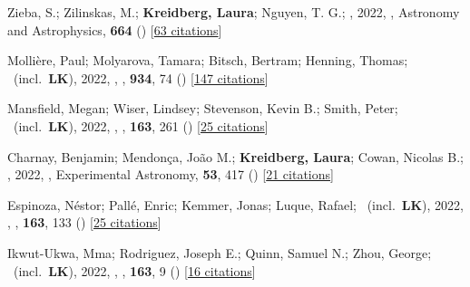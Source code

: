 \item[{\color{numcolor}\scriptsize67}] Zieba, S.; Zilinskas, M.; \textbf{Kreidberg, Laura}; Nguyen, T. G.; \etal, 2022, , Astronomy and Astrophysics, \textbf{664} () [\href{https://ui.adsabs.harvard.edu/abs/2022A&A...664A..79Z}{63 citations}]

\item[{\color{numcolor}\scriptsize66}] Molli{\`e}re, Paul; Molyarova, Tamara; Bitsch, Bertram; Henning, Thomas; \etal\ (incl.\ \textbf{LK}), 2022, , \apj, \textbf{934}, 74 () [\href{https://ui.adsabs.harvard.edu/abs/2022ApJ...934...74M}{147 citations}]

\item[{\color{numcolor}\scriptsize65}] Mansfield, Megan; Wiser, Lindsey; Stevenson, Kevin B.; Smith, Peter; \etal\ (incl.\ \textbf{LK}), 2022, , \aj, \textbf{163}, 261 () [\href{https://ui.adsabs.harvard.edu/abs/2022AJ....163..261M}{25 citations}]

\item[{\color{numcolor}\scriptsize64}] Charnay, Benjamin; Mendon{\c{c}}a, Jo{\~a}o M.; \textbf{Kreidberg, Laura}; Cowan, Nicolas B.; \etal, 2022, , Experimental Astronomy, \textbf{53}, 417 () [\href{https://ui.adsabs.harvard.edu/abs/2022ExA....53..417C}{21 citations}]

\item[{\color{numcolor}\scriptsize63}] Espinoza, N{\'e}stor; Pall{\'e}, Enric; Kemmer, Jonas; Luque, Rafael; \etal\ (incl.\ \textbf{LK}), 2022, , \aj, \textbf{163}, 133 () [\href{https://ui.adsabs.harvard.edu/abs/2022AJ....163..133E}{25 citations}]

\item[{\color{numcolor}\scriptsize62}] Ikwut-Ukwa, Mma; Rodriguez, Joseph E.; Quinn, Samuel N.; Zhou, George; \etal\ (incl.\ \textbf{LK}), 2022, , \aj, \textbf{163}, 9 () [\href{https://ui.adsabs.harvard.edu/abs/2022AJ....163....9I}{16 citations}]

